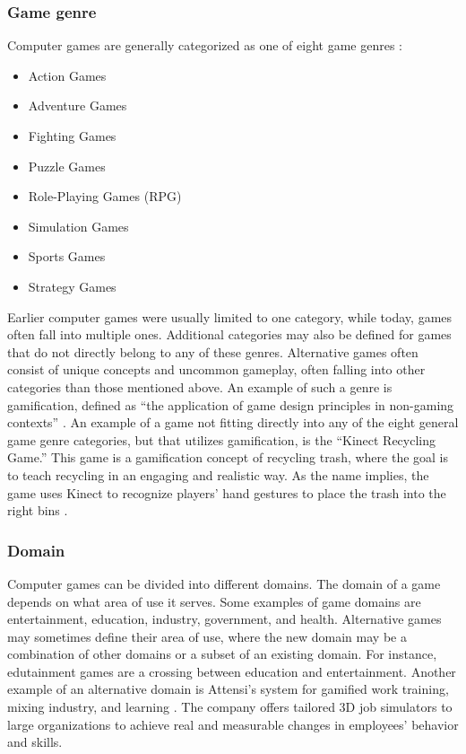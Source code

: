 \documentclass[../Main.tex]{subfiles}
\begin{document}
\subsubsection{Game genre}
Computer games are generally categorized as one of eight game genres \citep{prensky_fun_2001}:

\begin{itemize}
    \item Action Games
    \item Adventure Games
    \item Fighting Games
    \item Puzzle Games
    \item Role-Playing Games (RPG)
    \item Simulation Games
    \item Sports Games
    \item Strategy Games
\end{itemize}

Earlier computer games were usually limited to one category, while today, games often fall into multiple ones. Additional categories may also be defined for games that do not directly belong to any of these genres. Alternative games often consist of unique concepts and uncommon gameplay, often falling into other categories than those mentioned above. An example of such a genre is gamification, defined as “the application of game design principles in non-gaming contexts” \cite{robson_is_2015}. An example of a game not fitting directly into any of the eight general game genre categories, but that utilizes gamification, is the “Kinect Recycling Game.” This game is a gamification concept of recycling trash, where the goal is to teach recycling in an engaging and realistic way. As the name implies, the game uses Kinect to recognize players' hand gestures to place the trash into the right bins \citep{wang_learning_2015}.

\subsubsection{Domain}
Computer games can be divided into different domains. The domain of a game depends on what area of use it serves. Some examples of game domains are entertainment, education, industry, government, and health. Alternative games may sometimes define their area of use, where the new domain may be a combination of other domains or a subset of an existing domain. For instance, edutainment games are a crossing between education and entertainment. Another example of an alternative domain is Attensi’s system for gamified work training, mixing industry, and learning \citep{attensi_why_2020}. The company offers tailored 3D job simulators to large organizations to achieve real and measurable changes in employees’ behavior and skills.
\end{document}

